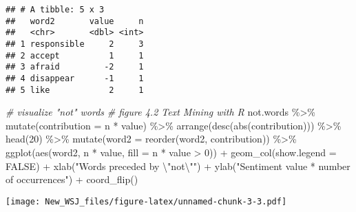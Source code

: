 \documentclass[
]{article}
\newenvironment{Shaded}{\begin{snugshade}}{\end{snugshade}}
\newcommand{\AttributeTok}[1]{\textcolor[rgb]{0.77,0.63,0.00}{#1}}
\newcommand{\CommentTok}[1]{\textcolor[rgb]{0.56,0.35,0.01}{\textit{#1}}}
\newcommand{\ConstantTok}[1]{\textcolor[rgb]{0.00,0.00,0.00}{#1}}
\newcommand{\DecValTok}[1]{\textcolor[rgb]{0.00,0.00,0.81}{#1}}
\newcommand{\FunctionTok}[1]{\textcolor[rgb]{0.00,0.00,0.00}{#1}}
\newcommand{\NormalTok}[1]{#1}
\newcommand{\SpecialCharTok}[1]{\textcolor[rgb]{0.00,0.00,0.00}{#1}}
\newcommand{\StringTok}[1]{\textcolor[rgb]{0.31,0.60,0.02}{#1}}
\begin{document}
\begin{verbatim}
## # A tibble: 5 x 3
##   word2       value     n
##   <chr>       <dbl> <int>
## 1 responsible     2     3
## 2 accept          1     1
## 3 afraid         -2     1
## 4 disappear      -1     1
## 5 like            2     1
\end{verbatim}

\begin{Shaded}
\begin{Highlighting}[]
\CommentTok{\# visualize "not" words}
\CommentTok{\# figure 4.2 Text Mining with R}
\NormalTok{not.words }\SpecialCharTok{\%\textgreater{}\%}
  \FunctionTok{mutate}\NormalTok{(}\AttributeTok{contribution =}\NormalTok{ n }\SpecialCharTok{*}\NormalTok{ value) }\SpecialCharTok{\%\textgreater{}\%}
  \FunctionTok{arrange}\NormalTok{(}\FunctionTok{desc}\NormalTok{(}\FunctionTok{abs}\NormalTok{(contribution))) }\SpecialCharTok{\%\textgreater{}\%}
  \FunctionTok{head}\NormalTok{(}\DecValTok{20}\NormalTok{) }\SpecialCharTok{\%\textgreater{}\%}
  \FunctionTok{mutate}\NormalTok{(}\AttributeTok{word2 =} \FunctionTok{reorder}\NormalTok{(word2, contribution)) }\SpecialCharTok{\%\textgreater{}\%}
  \FunctionTok{ggplot}\NormalTok{(}\FunctionTok{aes}\NormalTok{(word2, n }\SpecialCharTok{*}\NormalTok{ value, }\AttributeTok{fill =}\NormalTok{ n }\SpecialCharTok{*}\NormalTok{ value }\SpecialCharTok{\textgreater{}} \DecValTok{0}\NormalTok{)) }\SpecialCharTok{+}
  \FunctionTok{geom\_col}\NormalTok{(}\AttributeTok{show.legend =} \ConstantTok{FALSE}\NormalTok{) }\SpecialCharTok{+}
  \FunctionTok{xlab}\NormalTok{(}\StringTok{"Words preceded by }\SpecialCharTok{\textbackslash{}"}\StringTok{not}\SpecialCharTok{\textbackslash{}"}\StringTok{"}\NormalTok{) }\SpecialCharTok{+}
  \FunctionTok{ylab}\NormalTok{(}\StringTok{"Sentiment value * number of occurrences"}\NormalTok{) }\SpecialCharTok{+}
  \FunctionTok{coord\_flip}\NormalTok{()}
\end{Highlighting}
\end{Shaded}

\texttt{[image: New\_WSJ\_files/figure-latex/unnamed-chunk-3-3.pdf]}
\end{document}
